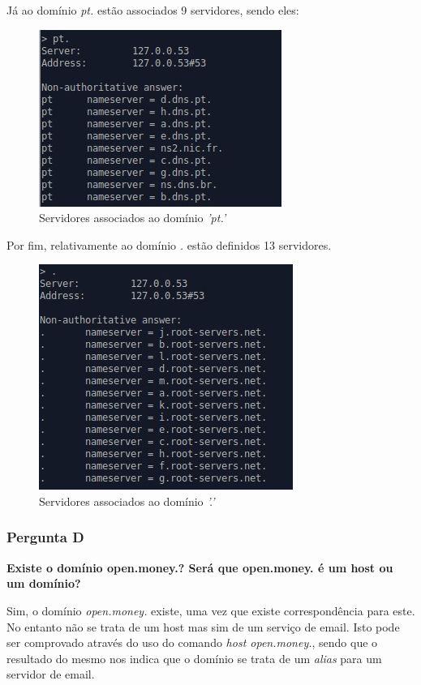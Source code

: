 \documentclass[11pt]{article}
\begin{document}
\par Já ao domínio \textit{pt.} estão associados 9 servidores, sendo eles:

\begin{figure}[!htb]
    \centering
    \includegraphics[width=.4\textwidth]{images/Parte1/p1_c2.jpg}
    \caption{Servidores associados ao domínio \textit{'pt.'}}
    \label{fig:dompt}
\end{figure}

\par Por fim, relativamente ao domínio \textit{.} estão definidos 13 servidores.

\begin{figure}[!htb]
    \centering
    \includegraphics[width=.4\textwidth]{images/Parte1/p1_c3.jpg}
    \caption{Servidores associados ao domínio \textit{'.'}}
    \label{fig:dot}
\end{figure}

\subsubsection{Pergunta D}

\textbf{Existe o domínio open.money.? Será que open.money. é um host ou um domínio?}

\par Sim, o domínio \textit{open.money.} existe, uma vez que existe correspondência para este. No entanto não se trata de um host mas sim de um serviço de email. Isto pode ser comprovado através do uso do comando \textit{host open.money.}, sendo que o resultado do mesmo nos indica que o domínio se trata de um \textit{alias} para um servidor de email.
\end{document}
